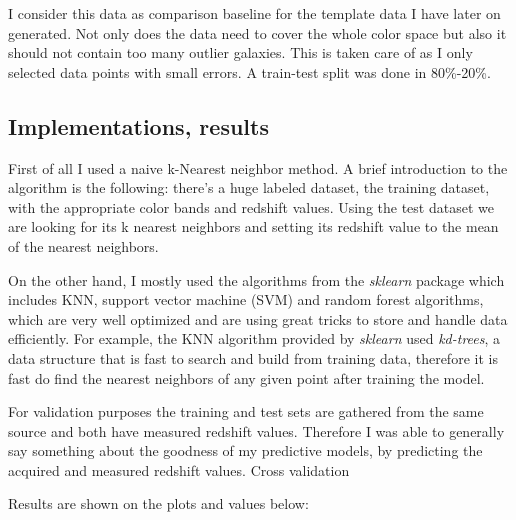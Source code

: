 \documentclass[a4paper,12pt]{article}
\begin{document}
\par I consider this data as comparison baseline for the template
data I have later on generated. Not only does the data need to cover
the whole color space but also it should not contain too many outlier
galaxies. This is taken care of as I only selected data points with
small errors. A train-test split was done in 80\%-20\%.

\subsection{Implementations, results}

\par First of all I used a naive k-Nearest neighbor method. A brief introduction
to the algorithm is the following: there's a huge labeled dataset, the training
dataset, with the appropriate color bands and redshift values. Using the test dataset
we are looking for its k nearest neighbors and setting its redshift value
to the mean of the nearest neighbors.

\par On the other hand, I mostly used the algorithms from the \textit{sklearn} package
\cite{sklearn} which includes KNN, support vector machine (SVM) and random forest algorithms, which
are very well optimized and are using great tricks to store and handle data efficiently.
For example, the KNN algorithm provided by \textit{sklearn} used \textit{kd-trees}, a data
structure that is fast to search and build from training data, therefore it is fast do find
the nearest neighbors of any given point after training the model.

\par For validation purposes the training and test sets are gathered from the
same source and both have measured redshift values. Therefore I was able to generally
say something about the goodness of my predictive models, by predicting the acquired and
measured redshift values. Cross validation

\par Results are shown on the plots and values below:
\end{document}
